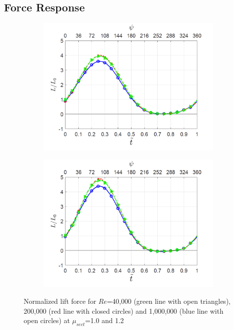 \subsection{Force Response}

\begin{figure}[H]
	\begin{subfigure}{0.5\textwidth}
		\includegraphics[width=1\textwidth]{figures/lift_Re_effect_lambda_1pt0.png}
		\label{fig:lift_Re_comparision_lambda_1p0}
	\end{subfigure}
 	\begin{subfigure}{0.5\textwidth}
		\includegraphics[width=1\textwidth]{figures/lift_Re_effect_lambda_1pt2.png}
		\label{fig:lift_Re_comparision_lambda_1p2}
	\end{subfigure}

 	\caption{Normalized lift force for $Re$=40,000 (green line with open triangles), 200,000 (red line with closed circles) and 1,000,000 (blue line with open circles) at $\mu_{sect}$=1.0 and 1.2}
 	\label{fig:lift_comparison}
\end{figure}

